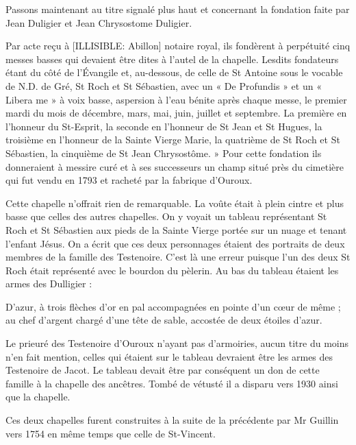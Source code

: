 Passons maintenant au titre signalé plus haut et concernant la fondation faite par Jean Duligier et Jean Chrysostome Duligier.

Par acte reçu à [ILLISIBLE: Abillon] notaire royal, ils fondèrent à perpétuité cinq messes basses qui devaient être dites à l'autel de la chapelle. Lesdits fondateurs étant du côté de l'Évangile et, au-dessous, de
celle de St Antoine sous le vocable de N.D. de Gré, St Roch et St Sébastien, avec un « De Profundis » et un « Libera me » à voix basse, aspersion à l'eau bénite après chaque messe, le premier mardi du mois de décembre, mars, mai, juin, juillet et septembre. La première en l'honneur du St-Esprit, la seconde en l'honneur de St Jean et St Hugues, la troisième en l'honneur de la Sainte Vierge Marie, la quatrième de St Roch et St Sébastien, la cinquième de St Jean Chrysostôme. » Pour cette fondation ils donneraient à messire curé et à ses successeurs un champ situé près du cimetière qui fut vendu en 1793 et racheté par la fabrique d'Ouroux.

Cette chapelle n'offrait rien de remarquable. La voûte était à plein cintre et plus basse que celles des autres chapelles. On y voyait un tableau représentant St Roch et St Sébastien aux pieds de la Sainte Vierge portée sur un nuage et tenant l'enfant Jésus. On a écrit que ces deux personnages étaient des portraits de deux membres de la famille des Testenoire. C'est là une erreur puisque l'un des deux St Roch était représenté avec le bourdon du pèlerin. Au bas du tableau étaient les armes des Dulligier :

D'azur, à trois flèches d'or en pal accompagnées en pointe d'un cœur de même ; au chef d'argent chargé d'une tête de sable, accostée de deux étoiles d'azur.

Le prieuré des Testenoire d'Ouroux n'ayant pas d'armoiries, aucun titre du moins n'en fait mention, celles qui étaient sur le tableau devraient être les armes des Testenoire de Jacot. Le tableau devait être par conséquent un don de cette famille à la chapelle des ancêtres. Tombé de vétusté il a disparu vers 1930 ainsi que la chapelle.


Ces deux chapelles furent construites à la suite de la précédente par Mr Guillin vers 1754 en même temps que celle de St-Vincent.


